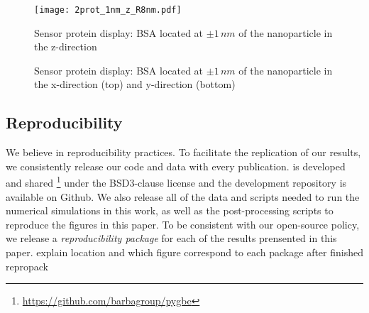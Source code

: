 \begin{figure*}[] %
   \centering
   \texttt{[image: 2prot\_1nm\_z\_R8nm.pdf]} 
   \caption{Sensor protein display: BSA located at $\pm 1 \, nm$ of the 
            nanoparticle in the z-direction}
   \label{fig:display_z}
\end{figure*}

\begin{figure*}[]

   \centering
    \vfill
    \caption{Sensor protein display: BSA located at $\pm 1 \, nm$ of the nanoparticle in the
            x-direction (top) and y-direction (bottom)}
    \label{fig:display_xy}
\end{figure*}

\subsection{Reproducibility} \label{sec:repro}

We believe in reproducibility practices. To facilitate the replication of our results, 
we consistently release our code and data with every publication. \pygbe is developed and 
shared \footnote{\url{https://github.com/barbagroup/pygbe}} under the BSD3-clause 
license and the development repository is available on Github. We also release
all of the data and scripts needed to run the numerical simulations in this work, 
as well as the post-processing scripts to reproduce the figures in this paper. To be consistent with our open-source policy, we release a \textit{reproducibility package} for each of the results prensented in
this paper. {\color{red} explain location and which figure correspond to each package
after finished repropack}

